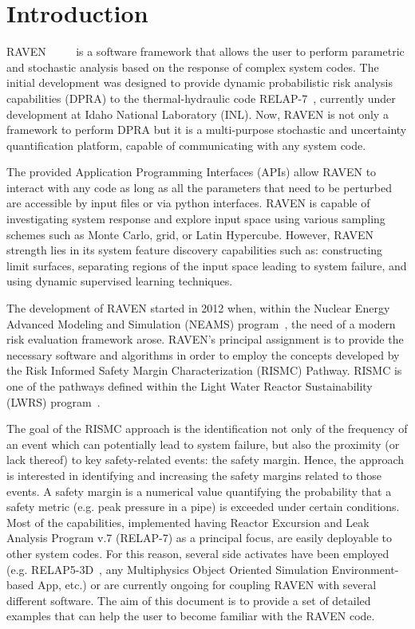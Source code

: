 \section{Introduction}
RAVEN~\cite{alfonsiMC} ~\cite{alfonsiPSA}~\cite{RAVENFY13}~\cite{ESREL2014} is a software framework that allows the user to perform parametric and stochastic
analysis based on the response of complex system codes.
The initial development was designed to provide dynamic probabilistic risk analysis
capabilities (DPRA) to the thermal-hydraulic code RELAP-7~\cite{relap7FY12}, currently under development
at Idaho National Laboratory (INL).
Now, RAVEN is not only a framework to perform DPRA but it is a
multi-purpose stochastic and uncertainty quantification platform, capable of communicating with any system code.

The provided Application Programming
Interfaces (APIs) allow RAVEN to interact with any code as long as all the parameters
that need to be perturbed are accessible by input files or via python
interfaces.
RAVEN is capable of investigating system response and explore input space using various
sampling schemes such as Monte Carlo, grid, or Latin Hypercube.
However, RAVEN strength lies in its system feature discovery capabilities such as: constructing
limit surfaces, separating regions of the input space leading to system failure,
and using dynamic supervised learning techniques.

The development of RAVEN started in 2012 when, within the Nuclear Energy
Advanced Modeling and Simulation (NEAMS) program~\cite{neams}, the need of a modern
risk evaluation framework arose.
RAVEN's principal assignment is to provide the necessary software and algorithms
in order to employ the concepts developed by the Risk Informed Safety Margin
Characterization (RISMC) Pathway.
RISMC is one of the pathways defined within the Light Water Reactor
Sustainability (LWRS) program~\cite{lwrs}.

The goal of the RISMC approach is  the identification not only of the frequency of an
event which can potentially lead to system failure, but also the proximity (or lack
thereof) to key safety-related events: the safety margin.
Hence, the approach is interested in identifying and increasing the safety
margins related to those events.
A safety margin is a numerical value quantifying the probability that a safety
metric (e.g. peak pressure in a pipe) is exceeded under certain conditions.
Most of the capabilities, implemented having Reactor Excursion and Leak Analysis Program v.7
(RELAP-7) as a principal focus, are
easily deployable to other system codes.
%
For this reason, several side activates have been employed (e.g.  RELAP5-3D~\cite{RELAP5userManual}, any Multiphysics Object Oriented
Simulation Environment-based App, etc.)
or are currently ongoing for coupling RAVEN with several different software.
%
The aim of this document is to provide a set of detailed examples that can help the user to become familiar with the RAVEN code.
